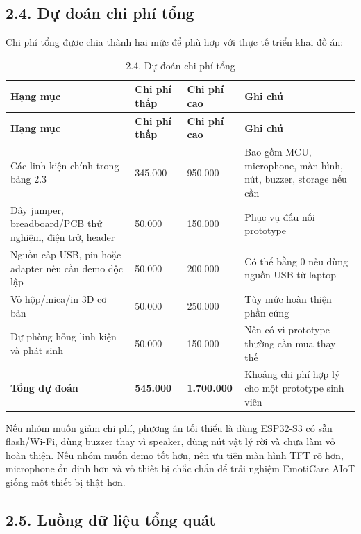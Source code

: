 \documentclass[12pt,a4paper]{article}
\begin{document}
\subsection*{2.4. Dự đoán chi phí tổng}

Chi phí tổng được chia thành hai mức để phù hợp với thực tế triển khai đồ án:


\begin{center}
\scriptsize
\begin{longtable}{|P{0.18\textwidth}|P{0.25\textwidth}|P{0.25\textwidth}|P{0.22\textwidth}|}
\caption{2.4. Dự đoán chi phí tổng}\\
\hline
\textbf{Hạng mục} & \textbf{Chi phí thấp} & \textbf{Chi phí cao} & \textbf{Ghi chú} \\
\hline
\endfirsthead
\hline
\textbf{Hạng mục} & \textbf{Chi phí thấp} & \textbf{Chi phí cao} & \textbf{Ghi chú} \\
\hline
\endhead
Các linh kiện chính trong bảng 2.3 & 345.000 & 950.000 & Bao gồm MCU, microphone, màn hình, nút, buzzer, storage nếu cần \\
\hline
Dây jumper, breadboard/PCB thử nghiệm, điện trở, header & 50.000 & 150.000 & Phục vụ đấu nối prototype \\
\hline
Nguồn cấp USB, pin hoặc adapter nếu cần demo độc lập & 50.000 & 200.000 & Có thể bằng 0 nếu dùng nguồn USB từ laptop \\
\hline
Vỏ hộp/mica/in 3D cơ bản & 50.000 & 250.000 & Tùy mức hoàn thiện phần cứng \\
\hline
Dự phòng hỏng linh kiện và phát sinh & 50.000 & 150.000 & Nên có vì prototype thường cần mua thay thế \\
\hline
\textbf{Tổng dự đoán} & \textbf{545.000} & \textbf{1.700.000} & Khoảng chi phí hợp lý cho một prototype sinh viên \\
\hline
\end{longtable}
\normalsize
\end{center}

Nếu nhóm muốn giảm chi phí, phương án tối thiểu là dùng ESP32-S3 có sẵn flash/Wi-Fi, dùng buzzer thay vì speaker, dùng nút vật lý rời và chưa làm vỏ hoàn thiện. Nếu nhóm muốn demo tốt hơn, nên ưu tiên màn hình TFT rõ hơn, microphone ổn định hơn và vỏ thiết bị chắc chắn để trải nghiệm EmotiCare AIoT giống một thiết bị thật hơn.


\subsection*{2.5. Luồng dữ liệu tổng quát}
\end{document}
